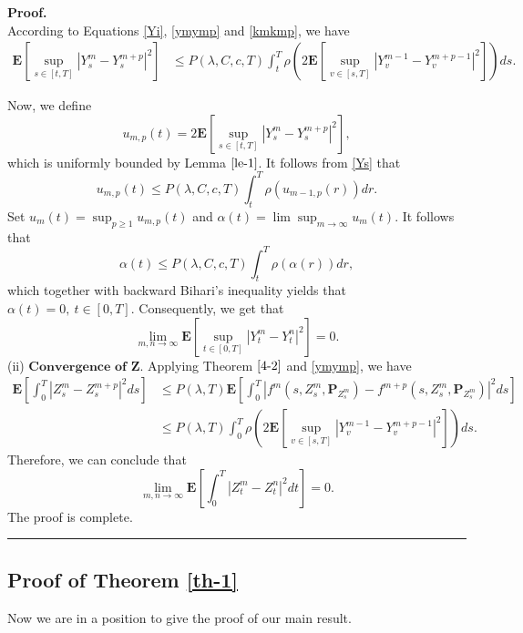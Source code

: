 \documentclass[10pt]{article}%
\numberwithin{equation}{section}
\newenvironment{proof}[1][Proof]{\noindent \textbf{#1.} }{\  \rule{0.5em}{0.5em}}
\def \E{\mathbf{E}}
\begin{document}
\begin{proof}
\begin{equation}
\end{equation}
 According to Equations \eqref{Yi}, \eqref{ymymp} and \eqref{kmkmp}, we have
 \begin{equation}\begin{split}\label{Ys}
   \mathbf{E}\left[\sup_{s\in[t,T]}\left|Y^m_s-Y^{m+p}_s\right|^2\right]
   &\leq P\left(\lambda, C,c,T\right)\int_{t}^{T}\rho\left(2\mathbf{E}\left[\sup_{v\in[s,T]}\left|Y_v^{m-1}-Y_{v}^{m+p-1}\right|^2\right]\right)ds.
 \end{split}
 \end{equation}
 
Now, we define $$u_{m,p}(t)=2\mathbf{E}\left[\sup_{s\in[t,T]}\left|Y^m_s-Y^{m+p}_s\right|^2\right],$$ which is uniformly bounded by Lemma $\ref{le-1}$. It follows from \eqref{Ys} that 
$$u_{m,p}(t)
\leq P\left(\lambda, C,c,T\right)\int_{t}^{T}\rho\left(u_{m-1,p}(r)\right)dr.$$Set $u_{m}(t)=\sup_{p\geq1}u_{m,p}(t)$ and $ \alpha(t)=\lim\sup_{m\rightarrow\infty}u_{m}(t)$. It follows that 
$$\alpha(t)\leq P\left(\lambda, C,c,T\right)\int_{t}^{T}\rho\left(\alpha(r)\right)dr,$$
which together with backward Bihari's inequality yields that $\alpha(t)=0,\ t\in[0,T]$. Consequently, we get that 
$$\lim_{m,n\rightarrow \infty}\mathbf{E}\left[\sup_{t\in[0,T]}\left|Y_{t}^m-Y_{t}^{n}\right|^2\right]=0.$$
(ii) $\textbf{Convergence of Z}$. Applying Theorem $\ref{4-2}$ and \eqref{ymymp}, we have  
\begin{equation}
    \begin{split}
    \E\left[\int_{0}^{T}\left|Z_s^m-Z_s^{m+p}\right|^2 ds\right]&\leq P(\lambda,T)\E\left[\int_{0}^{T}\left|f^m(s,Z^m_s,\mathbf{P}_{Z^m_s})-f^{m+p}(s,Z^m_s,\mathbf{P}_{Z^m_s})\right|^2ds\right]\\
    &\leq P\left(\lambda, T\right)\int_{0}^{T}\rho\left(2\mathbf{E}\left[\sup_{v\in[s,T]}\left|Y_v^{m-1}-Y_{v}^{m+p-1}\right|^2\right]\right)ds.
    \end{split}
\end{equation}
Therefore,  we can conclude that 
$$\lim_{m,n\rightarrow \infty}\mathbf{E}\left[\int_{0}^{T}\left|Z_{t}^m-Z_{t}^{n}\right|^2dt\right]=0.$$
The proof is complete.
\end{proof}
\subsection{Proof of Theorem \ref{th-1}}
Now we are in a position to give the proof of our main result. %
\end{document}
